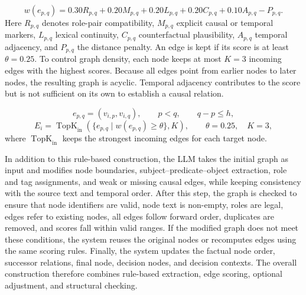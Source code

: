 \documentclass[pdflatex,sn-mathphys-num]{sn-jnl}%
\theoremstyle{thmstyleone}%
\theoremstyle{thmstyletwo}%
\theoremstyle{thmstylethree}%
\begin{document}
\begin{equation}
w(e_{p,q})=0.30R_{p,q}+0.20M_{p,q}+0.20L_{p,q}+0.20C_{p,q}+0.10A_{p,q}-P_{p,q}.
\end{equation}
Here $R_{p,q}$ denotes role-pair compatibility, $M_{p,q}$ explicit causal or temporal markers, $L_{p,q}$ lexical continuity, $C_{p,q}$ counterfactual plausibility, $A_{p,q}$ temporal adjacency, and $P_{p,q}$ the distance penalty. An edge is kept if its score is at least $\theta = 0.25$. To control graph density, each node keeps at most $K = 3$ incoming edges with the highest scores. Because all edges point from earlier nodes to later nodes, the resulting graph is acyclic. Temporal adjacency contributes to the score but is not sufficient on its own to establish a causal relation.

\begin{equation}
e_{p,q}=(v_{i,p},v_{i,q}),\qquad p<q,\qquad q-p\le h,
\end{equation}
\begin{equation}
E_i=\operatorname{TopK}_{\mathrm{in}}\left(\{e_{p,q}\mid w(e_{p,q})\ge \theta\},K\right),\qquad \theta=0.25,\quad K=3,
\end{equation}
where $\operatorname{TopK}_{\mathrm{in}}$ keeps the strongest incoming edges for each target node.

In addition to this rule-based construction, the LLM takes the initial graph as input and modifies node boundaries, subject--predicate--object extraction, role and tag assignments, and weak or missing causal edges, while keeping consistency with the source text and temporal order. After this step, the graph is checked to ensure that node identifiers are valid, node text is non-empty, roles are legal, edges refer to existing nodes, all edges follow forward order, duplicates are removed, and scores fall within valid ranges. If the modified graph does not meet these conditions, the system reuses the original nodes or recomputes edges using the same scoring rules. Finally, the system updates the factual node order, successor relations, final node, decision nodes, and decision contexts. The overall construction therefore combines rule-based extraction, edge scoring, optional adjustment, and structural checking.
\end{document}
